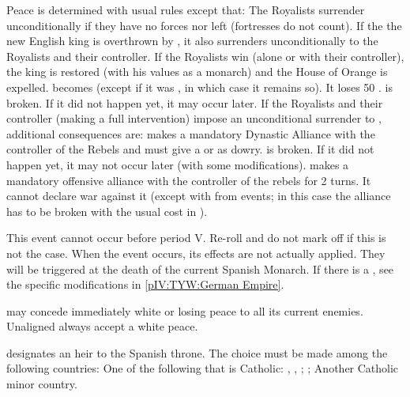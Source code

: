 \phpaix
\aparag Peace is determined with usual rules except that:
\bparag The Royalists surrender unconditionally if they have no forces nor
\REVOLT left (fortresses do not count).
\aparag If the the new English king is overthrown by \REVOLT , it also
surrenders unconditionally to the Royalists and their controller.
 If the Royalists win (alone or with their
controller), the king is restored (with his values as a monarch) and the House
of Orange is expelled.
\bparag \ENG becomes \CATHCR (except if it was \CATHCO, in which case it
remains so). It loses 50 \PV.
\bparag {} is broken. If it did not happen yet, it may
occur later.
 If the Royalists and their controller
(making a full intervention) impose an unconditional surrender to \ENG,
additional consequences are:
\bparag \ENG makes a mandatory Dynastic Alliance with the controller of the
Rebels and must give a \COL or \TP as dowry.
\bparag {} is broken. If it did not happen yet, it may
not occur later (with some modifications).%
%
\bparag \ENG makes a mandatory offensive alliance with the controller of the
rebels for 2 turns. It cannot declare war against it (except with \CB from
events; in this case the alliance has to be broken with the usual cost in
\STAB).





\activation{}
\aparag This event cannot occur before period V. Re-roll and do not mark off
if this is not the case.
\aparag When the event occurs, its effects are not actually applied. They will
be triggered at the death of the current Spanish Monarch.
\aparag If there is a \GE, see the specific modifications in
\ref{pIV:TYW:German Empire}.


\phevnt
\aparag \SPA may concede immediately white or losing peace to all its current
enemies. Unaligned \MIN always accept a white peace.

\phdipl
\aparag \SPA designates an heir to the Spanish throne. The choice must be made
among the following countries:
\bparag One of the following \MAJ that is Catholic: \FRA, \AUS, \ENG;
\bparag \AUSMin;
\bparag Another Catholic minor country.

